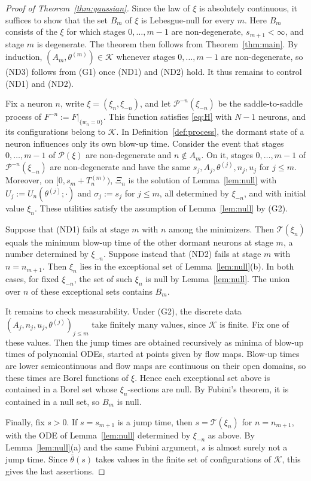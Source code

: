 \documentclass[11pt]{article}
\theoremstyle{definition}
\theoremstyle{remark}
\numberwithin{equation}{section}
\newcommand{\cK}{\mathcal{K}}
\newcommand{\cT}{\mathcal{T}}
\newcommand{\cP}{\mathcal{P}}
\newcommand{\ND}[1]{\textup{(ND#1)}}
\begin{document}
\begin{proof}[Proof of Theorem~\ref{thm:gaussian}]
Since the law of $\xi$ is absolutely continuous, it suffices to show that the set $B_m$ of $\xi$ is Lebesgue-null for every $m$. Here $B_m$ consists of the $\xi$ for which stages $0,\dots,m-1$ are non-degenerate, $s_{m+1}<\infty$, and stage $m$ is degenerate. The theorem then follows from Theorem~\ref{thm:main}. By induction, $(A_m,\theta^{(m)})\in\cK$ whenever stages $0,\dots,m-1$ are non-degenerate, so \ND3 follows from (G1) once \ND1 and \ND2 hold. It thus remains to control \ND1 and \ND2.

Fix a neuron $n$, write $\xi=(\xi_n,\xi_{-n})$, and let $\cP^{-n}(\xi_{-n})$ be the saddle-to-saddle process of $F^{-n}:=F|_{\{w_n=0\}}$. This function satisfies \eqref{eq:H} with $N-1$ neurons, and its configurations belong to $\cK$. In Definition~\ref{def:process}, the dormant state of a neuron influences only its own blow-up time. Consider the event that stages $0,\dots,m-1$ of $\cP(\xi)$ are non-degenerate and $n\notin A_m$. On it, stages $0,\dots,m-1$ of $\cP^{-n}(\xi_{-n})$ are non-degenerate and have the same $s_j,A_j,\theta^{(j)},n_j,u_j$ for $j\le m$. Moreover, on $[0,s_m+T^{(m)}_n)$, $\Xi_n$ is the solution of Lemma~\ref{lem:null} with $U_j:=U_n(\theta^{(j)};\cdot)$ and $\sigma_j:=s_j$ for $j\le m$, all determined by $\xi_{-n}$, and with initial value $\xi_n$. These utilities satisfy the assumption of Lemma~\ref{lem:null} by (G2).

Suppose that \ND1 fails at stage $m$ with $n$ among the minimizers. Then $\cT(\xi_n)$ equals the minimum blow-up time of the other dormant neurons at stage $m$, a number determined by $\xi_{-n}$. Suppose instead that \ND2 fails at stage $m$ with $n=n_{m+1}$. Then $\xi_n$ lies in the exceptional set of Lemma~\ref{lem:null}(b). In both cases, for fixed $\xi_{-n}$, the set of such $\xi_n$ is null by Lemma~\ref{lem:null}. The union over $n$ of these exceptional sets contains $B_m$.

It remains to check measurability. Under (G2), the discrete data $(A_j,n_j,u_j,\theta^{(j)})_{j\le m}$ take finitely many values, since $\cK$ is finite. Fix one of these values. Then the jump times are obtained recursively as minima of blow-up times of polynomial ODEs, started at points given by flow maps. Blow-up times are lower semicontinuous and flow maps are continuous on their open domains, so these times are Borel functions of $\xi$. Hence each exceptional set above is contained in a Borel set whose $\xi_n$-sections are null. By Fubini's theorem, it is contained in a null set, so $B_m$ is null.

Finally, fix $s>0$. If $s=s_{m+1}$ is a jump time, then $s=\cT(\xi_n)$ for $n=n_{m+1}$, with the ODE of Lemma~\ref{lem:null} determined by $\xi_{-n}$ as above. By Lemma~\ref{lem:null}(a) and the same Fubini argument, $s$ is almost surely not a jump time. Since $\bar\theta(s)$ takes values in the finite set of configurations of $\cK$, this gives the last assertions.
\end{proof}
\end{document}
